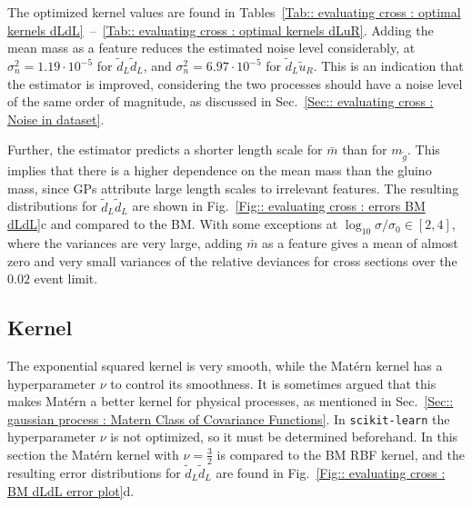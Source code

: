 \documentclass[twoside,english]{uiofysmaster}
\begin{document}
{The optimized kernel values are found in Tables~\ref{Tab:: evaluating cross : optimal kernels dLdL}~--~\ref{Tab:: evaluating cross : optimal kernels dLuR}. Adding the mean mass as a feature reduces the estimated noise level considerably, at $\sigma_n^2 = 1.19 \cdot 10^{-5}$ for $\widetilde{d}_L \widetilde{d}_L$, and $\sigma_n^2 = 6.97 \cdot 10^{-5}$ for $\widetilde{d}_L \widetilde{u}_R$. This is an indication that the estimator is improved, considering the two processes should have a noise level of the same order of magnitude, as discussed in Sec.~\ref{Sec:: evaluating cross : Noise in dataset}. 

Further, the estimator predicts a shorter length scale for $\bar{m}$ than for $m_{\widetilde{g}}$. This implies that there is a higher dependence on the mean mass than the gluino mass, since GPs attribute large length scales to irrelevant features. The resulting distributions for $\widetilde{d}_L \widetilde{d}_L$ are shown in Fig.~\ref{Fig:: evaluating cross : errors BM dLdL}c and compared to the BM. With some exceptions at $\log_{10} \sigma/\sigma_0 \in [2,4]$, where the variances are very large, adding $\bar{m}$ as a feature gives a mean of almost zero and very small variances of the relative deviances for cross sections over the $0.02$ event limit. 




\subsection{Kernel}

The exponential squared kernel is very smooth, while the Mat\'{e}rn kernel has a hyperparameter $\nu$ to control its smoothness. It is sometimes argued that this makes Mat\'{e}rn a better kernel for physical processes, as mentioned in Sec.~\ref{Sec:: gaussian process : Matern Class of Covariance Functions}. In \verb|scikit-learn| the hyperparameter $\nu$ is not optimized, so it must be determined beforehand. In this section the Mat\'{e}rn kernel with $\nu=\frac{3}{2}$ is compared to the BM RBF kernel, and the resulting error distributions for $\widetilde{d}_L \widetilde{d}_L$ are found in Fig.~\ref{Fig:: evaluating cross : BM dLdL error plot}d. 

}
\end{document}
